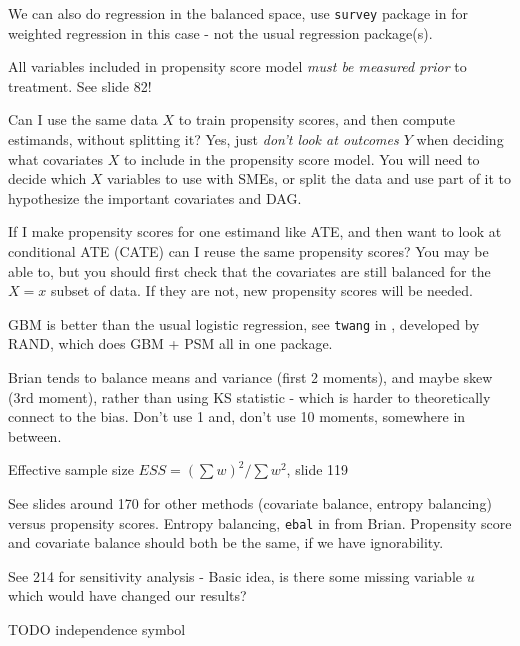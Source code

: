 We can also do regression in the balanced space, use \texttt{survey} package in \R for weighted regression in this case - not the usual regression package(s).

All variables included in propensity score model \emph{must be measured prior} to treatment. See slide 82!

Can I use the same data $X$ to train propensity scores, and then compute estimands, without splitting it?
Yes, just \emph{don't look at outcomes $Y$} when deciding what covariates $X$ to include in the propensity score model.
You will need to decide which $X$ variables to use \apriori with SMEs,
or split the data and use part of it to hypothesize the important covariates and DAG.

If I make propensity scores for one estimand like ATE, and then want to look at conditional ATE (CATE) can I reuse the same propensity scores?
You may be able to, but you should first check that the covariates are still balanced for the $X = x$ subset of data. If they are not, new propensity scores will be needed.

GBM is better than the usual logistic regression, see \texttt{twang} in \R, developed by RAND, which does GBM + PSM all in one package.

Brian tends to balance means and variance (first 2 moments), and maybe skew (3rd moment), rather than using KS statistic - which is harder to theoretically connect to the bias.
Don't use 1 and, don't use 10 moments, somewhere in between.

Effective sample size $ESS = \left(\sum w\right)^2 / \sum w^2$, slide 119

See slides around 170 for other methods (covariate balance, entropy balancing) versus propensity scores.
Entropy balancing, \texttt{ebal} in \R from Brian.
Propensity score and covariate balance should both be the same, if we have ignorability.

See 214 for sensitivity analysis - Basic idea, is there some missing variable $u$ which would have changed our results?

TODO independence symbol \indep
